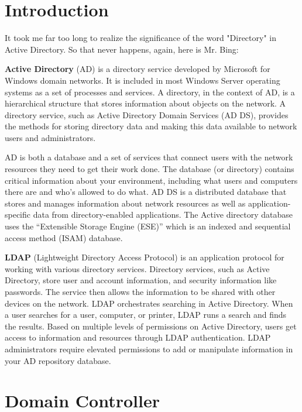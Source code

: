 \documentclass{article}
\begin{document}
\graphicspath{ {./Images/} }
\tableofcontents

\section{Introduction}
It took me far too long to realize the significance of the word "Directory" in Active Directory. So that never happens, again, here is Mr. Bing:

\textbf{Active Directory} (AD) is a directory service developed by Microsoft for Windows domain networks. 
It is included in most Windows Server operating systems as a set of processes and services. 
A directory, in the context of AD, is a hierarchical structure that stores information about objects on the network.
A directory service, such as Active Directory Domain Services (AD DS), provides the methods for storing directory data and making this data available 
to network users and administrators.

AD is both a database and a set of services that connect users with the network resources they need to get their work done. 
The database (or directory) contains critical information about your environment, including what users and computers there are and who’s allowed to do what. 
AD DS is a distributed database that stores and manages information about network resources as well as application-specific data from directory-enabled applications. 
The Active directory database uses the “Extensible Storage Engine (ESE)” which is an indexed and sequential access method (ISAM) database.

\textbf{LDAP} (Lightweight Directory Access Protocol) is an application protocol for working with various directory services. 
Directory services, such as Active Directory, store user and account information, and security information like passwords. 
The service then allows the information to be shared with other devices on the network. LDAP orchestrates searching in Active Directory. 
When a user searches for a user, computer, or printer, LDAP runs a search and finds the results. Based on multiple levels of permissions on Active Directory, 
users get access to information and resources through LDAP authentication. LDAP administrators require elevated permissions to add or manipulate information in 
your AD repository database.

\section{Domain Controller}
\end{document}
